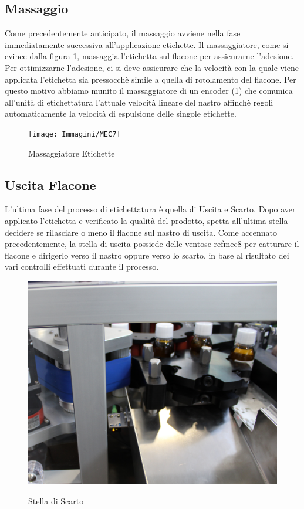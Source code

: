 \documentclass[12pt, a4paper, oneside]{book}
\begin{document}
\subsection{Massaggio}
Come precedentemente anticipato, il massaggio avviene nella fase immediatamente successiva all'applicazione etichette. Il massaggiatore, come si evince dalla figura \ref{MEC7}, massaggia l'etichetta sul flacone per assicurarne l'adesione. Per ottimizzarne l'adesione, ci si deve assicurare che la velocità con la quale viene applicata l'etichetta sia pressocchè simile a quella di rotolamento del flacone. Per questo motivo abbiamo munito il massaggiatore di un encoder (1) che comunica all'unità di etichettatura l'attuale velocità lineare del nastro affinchè regoli automaticamente la velocità di espulsione delle singole etichette.

\begin{figure}[H]
	\centering
	\texttt{[image: Immagini/MEC7]}
	\label{MEC7}
	\caption{ Massaggiatore Etichette }
\end{figure}

\subsection{Uscita Flacone}
L'ultima fase del processo di etichettatura è quella di Uscita e Scarto. Dopo aver applicato l'etichetta e verificato la qualità del prodotto, spetta all'ultima stella decidere se rilasciare o meno il flacone sul nastro di uscita. Come accennato precedentemente, la stella di uscita possiede delle ventose ref{mec8} per catturare il flacone e dirigerlo verso il nastro oppure verso lo scarto, in base al risultato dei vari controlli effettuati durante il processo.

\begin{figure}[H]
	\centering
	\includegraphics[width=12cm]{Immagini/MEC8}
	\label{mec8}
	\caption{ Stella di Scarto }
\end{figure}
\end{document}
